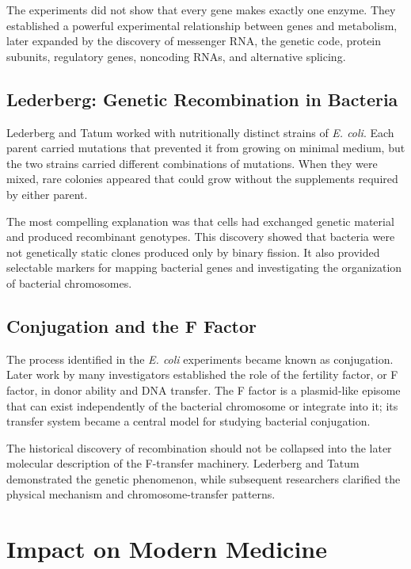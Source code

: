 The experiments did not show that every gene makes exactly one enzyme. They established a powerful experimental relationship between genes and metabolism, later expanded by the discovery of messenger RNA, the genetic code, protein subunits, regulatory genes, noncoding RNAs, and alternative splicing.

\subsection{Lederberg: Genetic Recombination in Bacteria}

Lederberg and Tatum worked with nutritionally distinct strains of \textit{E. coli}. Each parent carried mutations that prevented it from growing on minimal medium, but the two strains carried different combinations of mutations. When they were mixed, rare colonies appeared that could grow without the supplements required by either parent.

The most compelling explanation was that cells had exchanged genetic material and produced recombinant genotypes. This discovery showed that bacteria were not genetically static clones produced only by binary fission. It also provided selectable markers for mapping bacterial genes and investigating the organization of bacterial chromosomes.

\subsection{Conjugation and the F Factor}

The process identified in the \textit{E. coli} experiments became known as conjugation. Later work by many investigators established the role of the fertility factor, or F factor, in donor ability and DNA transfer. The F factor is a plasmid-like episome that can exist independently of the bacterial chromosome or integrate into it; its transfer system became a central model for studying bacterial conjugation.

The historical discovery of recombination should not be collapsed into the later molecular description of the F-transfer machinery. Lederberg and Tatum demonstrated the genetic phenomenon, while subsequent researchers clarified the physical mechanism and chromosome-transfer patterns.

\section{Impact on Modern Medicine}

